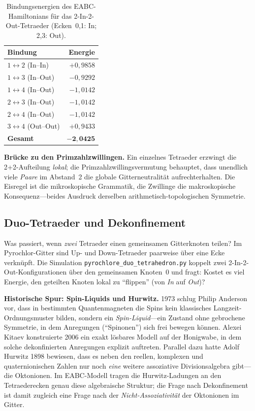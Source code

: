 \documentclass[11pt,a4paper]{article}
\begin{document}
\begin{table}[htbp]
  \centering
  \caption{Bindungsenergien des EABC-Hamiltonians für das 2-In-2-Out-Tetraeder (Ecken~0,1: In; 2,3: Out).}
  \label{tab:tetra-energie}
  \begin{tabular}{l r}
    \hline
    Bindung & Energie \\
    \hline
    $1 \leftrightarrow 2$ (In--In)   & $+0{,}9858$ \\
    $1 \leftrightarrow 3$ (In--Out)    & $-0{,}9292$ \\
    $1 \leftrightarrow 4$ (In--Out)    & $-1{,}0142$ \\
    $2 \leftrightarrow 3$ (In--Out)    & $-1{,}0142$ \\
    $2 \leftrightarrow 4$ (In--Out)    & $-1{,}0142$ \\
    $3 \leftrightarrow 4$ (Out--Out)   & $+0{,}9433$ \\
    \hline
    \textbf{Gesamt}                    & $\mathbf{-2{,}0425}$ \\
    \hline
  \end{tabular}
\end{table}

\medskip
\noindent\textbf{Brücke zu den Primzahlzwillingen.} Ein einzelnes Tetraeder erzwingt die 2+2-Aufteilung \emph{lokal}; die Primzahlzwillingsvermutung behauptet, dass unendlich viele \emph{Paare} im Abstand~2 die globale Gitterneutralität aufrechterhalten. Die Eisregel ist die mikroskopische Grammatik, die Zwillinge die makroskopische Konsequenz---beides Ausdruck derselben arithmetisch-topologischen Symmetrie.

\subsection{Duo-Tetraeder und Dekonfinement}

Was passiert, wenn \emph{zwei} Tetraeder einen gemeinsamen Gitterknoten teilen? Im Pyrochlor-Gitter sind Up- und Down-Tetraeder paarweise über eine Ecke verknüpft. Die Simulation \texttt{pyrochlore\_duo\_tetrahedron.py} koppelt zwei 2-In-2-Out-Konfigurationen über den gemeinsamen Knoten~0 und fragt: Kostet es viel Energie, den geteilten Knoten lokal zu ``flippen'' (von \emph{In} auf \emph{Out})?

\medskip
\noindent\textbf{Historische Spur: Spin-Liquids und Hurwitz.} 1973 schlug Philip Anderson vor, dass in bestimmten Quantenmagneten die Spins kein klassisches Langzeit-Ordnungsmuster bilden, sondern ein \emph{Spin-Liquid}---ein Zustand ohne gebrochene Symmetrie, in dem Anregungen (``Spinonen'') sich frei bewegen können. Alexei Kitaev konstruierte 2006 ein exakt lösbares Modell auf der Honigwabe, in dem solche dekonfinierten Anregungen explizit auftreten. Parallel dazu hatte Adolf Hurwitz 1898 bewiesen, dass es neben den reellen, komplexen und quaternionischen Zahlen nur noch \emph{eine} weitere assoziative Divisionsalgebra gibt---die Oktonionen. Im EABC-Modell tragen die Hurwitz-Ladungen an den Tetraederecken genau diese algebraische Struktur; die Frage nach Dekonfinement ist damit zugleich eine Frage nach der \emph{Nicht-Assoziativität} der Oktonionen im Gitter.
\end{document}
